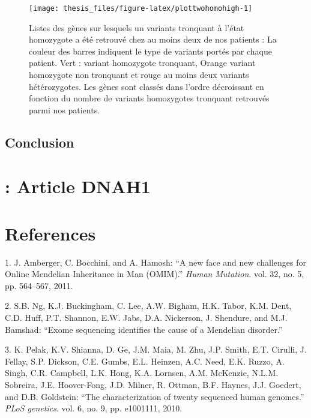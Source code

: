 \documentclass[12pt,twoside]{reedthesis}
\theoremstyle{definition}
\theoremstyle{definition}
\theoremstyle{remark}
\begin{document}
  \newpage
  
  \begin{figure}
  
  {\centering \texttt{[image: thesis\_files/figure-latex/plottwohomohigh-1]} 
  
  }
  
  \caption[Listes des gènes sur lesquels un variants tronquant à l'état homozygote a été retrouvé chez au moins deux de nos patients]{Listes des gènes sur lesquels un variants tronquant à l'état homozygote a été retrouvé chez au moins deux de nos patients : La couleur des barres indiquent le type de variants portés par chaque patient. Vert : variant homozygote tronquant, Orange variant homozygote non tronquant et rouge au moins deux variants hétérozygotes. Les gènes sont classés dans l'ordre décroissant en fonction du nombre de variants homozygotes tronquant retrouvés parmi nos patients.}\label{fig:plottwohomohigh}
  \end{figure}
  
  \newpage
  
  \section{Conclusion}\label{conclusion}
  
  \chapter{: Article DNAH1}\label{article-dnah1}
  
  \chapter*{References}\label{references}
  
  \hypertarget{refs}{}
  \hypertarget{ref-Amberger2011}{}
  1. J. Amberger, C. Bocchini, and A. Hamosh: ``A new face and new
  challenges for Online Mendelian Inheritance in Man (OMIM).'' \emph{Human
  Mutation}. vol. 32, no. 5, pp. 564--567, 2011.
  
  \hypertarget{ref-Ng}{}
  2. S.B. Ng, K.J. Buckingham, C. Lee, A.W. Bigham, H.K. Tabor, K.M. Dent,
  C.D. Huff, P.T. Shannon, E.W. Jabs, D.A. Nickerson, J. Shendure, and
  M.J. Bamshad: ``Exome sequencing identifies the cause of a Mendelian
  disorder.''
  
  \hypertarget{ref-Pelak2010}{}
  3. K. Pelak, K.V. Shianna, D. Ge, J.M. Maia, M. Zhu, J.P. Smith, E.T.
  Cirulli, J. Fellay, S.P. Dickson, C.E. Gumbs, E.L. Heinzen, A.C. Need,
  E.K. Ruzzo, A. Singh, C.R. Campbell, L.K. Hong, K.A. Lornsen, A.M.
  McKenzie, N.L.M. Sobreira, J.E. Hoover-Fong, J.D. Milner, R. Ottman,
  B.F. Haynes, J.J. Goedert, and D.B. Goldstein: ``The characterization of
  twenty sequenced human genomes.'' \emph{PLoS genetics}. vol. 6, no. 9,
  pp. e1001111, 2010.
  
\end{document}
